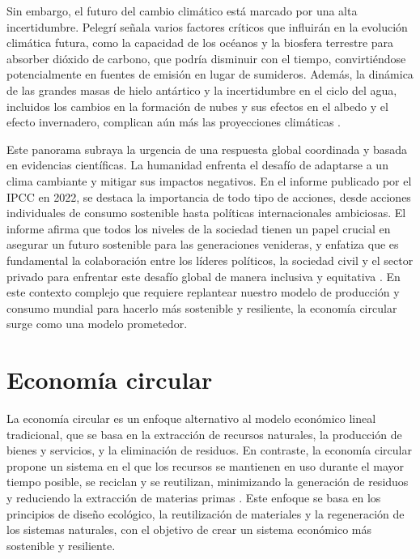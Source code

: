 \documentclass[main.tex]{subfiles}
\begin{document}
Sin embargo, el futuro del cambio climático está marcado por una alta incertidumbre. Pelegrí señala varios factores críticos que influirán en la evolución climática futura, como la capacidad de los océanos y la biosfera terrestre para absorber dióxido de carbono, que podría disminuir con el tiempo, convirtiéndose potencialmente en fuentes de emisión en lugar de sumideros. Además, la dinámica de las grandes masas de hielo antártico y la incertidumbre en el ciclo del agua, incluidos los cambios en la formación de nubes y sus efectos en el albedo y el efecto invernadero, complican aún más las proyecciones climáticas \cite{pelegri2021ipcc}.

Este panorama subraya la urgencia de una respuesta global coordinada y basada en evidencias científicas. La humanidad enfrenta el desafío de adaptarse a un clima cambiante y mitigar sus impactos negativos. En el informe publicado por el IPCC en 2022, se destaca la importancia de todo tipo de acciones, desde acciones individuales de consumo sostenible hasta políticas internacionales ambiciosas. El informe afirma que todos los niveles de la sociedad tienen un papel crucial en asegurar un futuro sostenible para las generaciones venideras, y enfatiza que es fundamental la colaboración entre los líderes políticos, la sociedad civil y el sector privado para enfrentar este desafío global de manera inclusiva y equitativa \cite{IPCC2022, pelegri2021ipcc}. En este contexto complejo que requiere replantear nuestro modelo de producción y consumo mundial para hacerlo más sostenible y resiliente, la economía circular surge como una modelo prometedor. 

\section{Economía circular}

La economía circular es un enfoque alternativo al modelo económico lineal tradicional, que se basa en la extracción de recursos naturales, la producción de bienes y servicios, y la eliminación de residuos. En contraste, la economía circular propone un sistema en el que los recursos se mantienen en uso durante el mayor tiempo posible, se reciclan y se reutilizan, minimizando la generación de residuos y reduciendo la extracción de materias primas \cite{ellenmacarthurfoundation2022}. Este enfoque se basa en los principios de diseño ecológico, la reutilización de materiales y la regeneración de los sistemas naturales, con el objetivo de crear un sistema económico más sostenible y resiliente.
\end{document}
